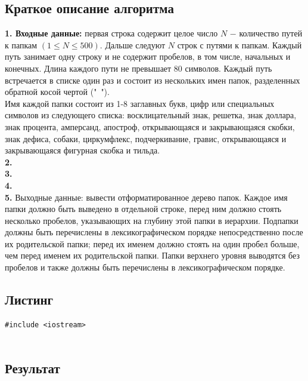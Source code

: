 \documentclass[a5paper, 10pt]{article}
\theoremstyle{definition}
\theoremstyle{plain}
\theoremstyle{remark}
\begin{document}
\subsection{Краткое описание алгоритма}
\textbf{1. Входные данные:} первая строка содержит целое число $N$ $-$ количество путей к папкам $(1 \leq N \leq 500)$. Дальше следуют $N$ строк с путями к папкам. Каждый путь занимает одну строку и не содержит пробелов, в том числе, начальных и конечных. Длина каждого пути не превышает $80$ символов. Каждый путь встречается в списке один раз и состоит из нескольких имен папок, разделенных обратной косой чертой ("\ "). \\
Имя каждой папки состоит из 1-8 заглавных букв, цифр или специальных символов из следующего списка: восклицательный знак, решетка, знак доллара, знак процента, амперсанд, апостроф, открывающаяся и закрывающаяся скобки, знак дефиса, собаки, циркумфлекс, подчеркивание, гравис, открывающаяся и закрывающаяся фигурная скобка и тильда. \\
\textbf{2.}  \\
\textbf{3.}  \\
\textbf{4.}  \\
\textbf{5.} Выходные данные: вывести отформатированное дерево папок. Каждое имя папки должно быть выведено в отдельной строке, перед ним должно стоять несколько пробелов, указывающих на глубину этой папки в иерархии. Подпапки должны быть перечислены в лексикографическом порядке непосредственно после их родительской папки; перед их именем должно стоять на один пробел больше, чем перед именем их родительской папки. Папки верхнего уровня выводятся без пробелов и также должны быть перечислены в лексикографическом порядке.

\subsection{Листинг}

\begin{center}
\begin{lstlisting}[label=some-code,caption={Исходный код для 1067}]
#include <iostream>


\end{lstlisting}
\end{center}

\subsection{Результат}
\end{document}
